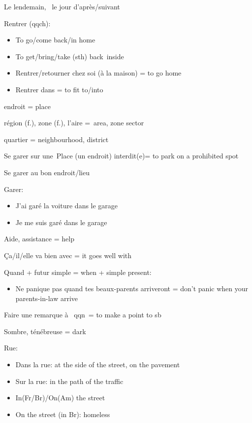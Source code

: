 Le lendemain,~ le jour d'après/suivant~

Rentrer (qqch):

\begin{itemize}
\item
  To go/come back/in home
\item
  To get/bring/take (sth) back~inside
\item
  {Rentrer/retourner chez soi (à la maison) = to go home}
\item
  {Rentrer dans = to fit to/into}
\end{itemize}

{endroit = place}

{région (f.), zone (f.), l'aire =~}{area, zone sector}

{quartier = neighbourhood, district}

Se garer sur une~Place (un endroit) interdit(e)= to park on a prohibited
spot

Se garer au bon endroit/lieu~

Garer:

\begin{itemize}
\item
  J'ai garé la voiture dans le garage~
\item
  Je me suis garé dans le garage~
\end{itemize}

Aide, assistance = help

Ça/il/elle va bien avec = it goes well with~

Quand + futur simple = when + simple present:

\begin{itemize}
\item
  Ne panique pas quand tes beaux-parents arriveront = don't panic when
  your parents-in-law arrive
\end{itemize}

Faire une remarque à~ qqn~= to make a point to sb

Sombre, ténébreuse = dark

Rue:

\begin{itemize}
\item
  Dans la rue: at the side of the street, on the pavement~
\item
  Sur la rue: in the path of the traffic~
\item
  In(Fr/Br)/On(Am) the street~
\item
  On the street (in Br): homeless~
\end{itemize}

